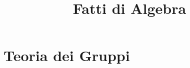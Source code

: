 \documentclass[a4paper,NoNotes,GeneralMath]{stdmdoc}
\begin{document}
	\title{Fatti di Algebra}

	\section*{Teoria dei Gruppi}
	
\end{document}

